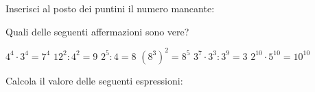 \documentclass[12pt]{exam}
\begin{document}
\begin{questions}
\begin{multicols}{2}
\end{multicols}
\addpoints



\question[10] Inserisci al posto dei puntini il numero mancante:
\noaddpoints %
\begin{multicols}{2}
\end{multicols}
\addpoints


{%
\checkboxchar{$\Box$} %
\question[15] Quali delle seguenti affermazioni sono vere?
\addpoints
\begin{multicols}{2}
\begin{checkboxes}
    \choice $ 4^4 \cdot 3^4 = 7^4 $
    \choice $ 12^2 : 4^2 = 9 $
    \choice $ 2^5 : 4 = 8 $
    \choice $ (8^3)^2 = 8^5  $
    \choice $ 3^7 \cdot 3^3 : 3^9 = 3 $
    \choice $ 2^{10} \cdot 5^{10} = 10^{10} $
\end{checkboxes}
\end{multicols}
}%



\question[30] Calcola il valore delle seguenti espressioni:
\noaddpoints %
\end{questions}
\end{document}
